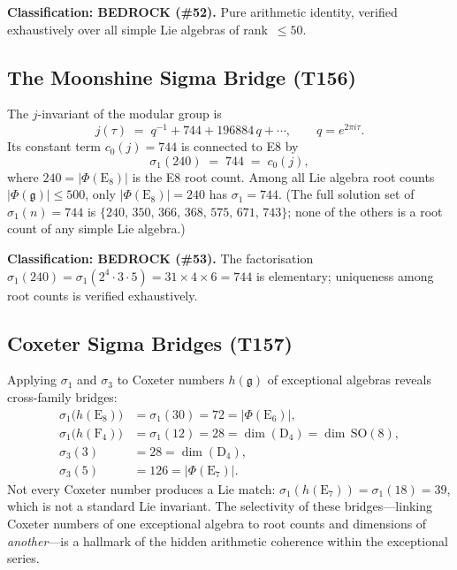 \documentclass[aps,prd,twocolumn,superscriptaddress,floatfix,nofootinbib]{revtex4-2}
\theoremstyle{definition}
\theoremstyle{remark}
\begin{document}
\textbf{Classification: BEDROCK (\#52).}  Pure arithmetic identity,
verified exhaustively over all simple Lie algebras of rank~$\le 50$.

\subsection{The Moonshine Sigma Bridge (T156)}
\label{sec:sigma-moonshine-bridge}

The $j$-invariant of the modular group is
\begin{equation}
  j(\tau) \;=\; q^{-1} + 744 + 196884\,q + \cdots,
  \qquad q = e^{2\pi i\tau}.
  \label{eq:j-expansion}
\end{equation}
Its constant term $c_0(j) = 744$ is connected to E8 by
\begin{equation}
  \sigma_1(240) \;=\; 744 \;=\; c_0(j),
  \label{eq:sigma-moonshine}
\end{equation}
where $240 = |\Phi(\mathrm{E}_8)|$ is the E8 root count.  Among
all Lie algebra root counts $|\Phi(\mathfrak{g})| \le 500$, only
$|\Phi(\mathrm{E}_8)| = 240$ has $\sigma_1 = 744$.  (The full solution
set of $\sigma_1(n) = 744$ is $\{240,\, 350,\, 366,\, 368,\, 575,\,
671,\, 743\}$; none of the others is a root count of any simple Lie
algebra.)

\textbf{Classification: BEDROCK (\#53).}  The factorisation
$\sigma_1(240) = \sigma_1(2^4 \cdot 3 \cdot 5)
  = 31 \times 4 \times 6 = 744$
is elementary; uniqueness among root counts is verified exhaustively.

\subsection{Coxeter Sigma Bridges (T157)}
\label{sec:coxeter-sigma}

Applying $\sigma_1$ and $\sigma_3$ to Coxeter numbers $h(\mathfrak{g})$
of exceptional algebras reveals cross-family bridges:
\begin{align}
  \sigma_1\!\bigl(h(\mathrm{E}_8)\bigr) &= \sigma_1(30) = 72
    = |\Phi(\mathrm{E}_6)|, \label{eq:cox-e8-e6}\\
  \sigma_1\!\bigl(h(\mathrm{F}_4)\bigr) &= \sigma_1(12) = 28
    = \dim(\mathrm{D}_4) = \dim\,\mathrm{SO}(8), \label{eq:cox-f4-d4}\\
  \sigma_3(3) &= 28 = \dim(\mathrm{D}_4),
    \label{eq:sigma3-a2-d4}\\
  \sigma_3(5) &= 126 = |\Phi(\mathrm{E}_7)|.
    \label{eq:sigma3-a4-e7}
\end{align}
Not every Coxeter number produces a Lie match: $\sigma_1(h(\mathrm{E}_7))
= \sigma_1(18) = 39$, which is not a standard Lie invariant.
The selectivity of these bridges---linking Coxeter numbers of one
exceptional algebra to root counts and dimensions of \emph{another}---is
a hallmark of the hidden arithmetic coherence within the exceptional
series.
\end{document}
